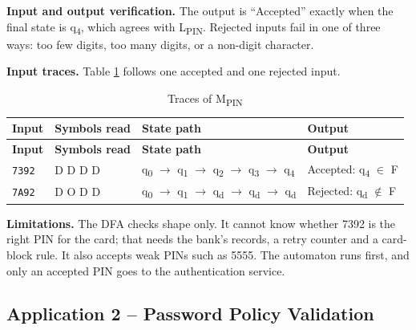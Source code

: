 \documentclass[12pt,a4paper]{article}
\begin{document}
\textbf{Input and output verification.} The output is ``Accepted'' exactly when the final state is q\textsubscript{4}, which agrees with L\textsubscript{PIN}. Rejected inputs fail in one of three ways: too few digits, too many digits, or a non-digit character.

\textbf{Input traces.} Table \ref{tab:pin_trace} follows one accepted and one rejected input.

{\small
\begin{longtable}{|>{\raggedright\arraybackslash}p{}|>{\raggedright\arraybackslash}p{}|>{\raggedright\arraybackslash}p{}|>{\raggedright\arraybackslash}p{}|}
\caption[Traces of MPIN]{Traces of M\textsubscript{PIN}}\label{tab:pin_trace}\\
\hline
\rowcolor{hdr}\textbf{Input} & \textbf{Symbols read} & \textbf{State path} & \textbf{Output}\\ \hline
\endfirsthead
\hline
\rowcolor{hdr}\textbf{Input} & \textbf{Symbols read} & \textbf{State path} & \textbf{Output}\\ \hline
\endhead
\texttt{7392} & D D D D & q\textsubscript{0} \ensuremath{\rightarrow} q\textsubscript{1} \ensuremath{\rightarrow} q\textsubscript{2} \ensuremath{\rightarrow} q\textsubscript{3} \ensuremath{\rightarrow} q\textsubscript{4} & Accepted: q\textsubscript{4} \ensuremath{\in} F\\ \hline
\texttt{7A92} & D O D D & q\textsubscript{0} \ensuremath{\rightarrow} q\textsubscript{1} \ensuremath{\rightarrow} q\textsubscript{d} \ensuremath{\rightarrow} q\textsubscript{d} \ensuremath{\rightarrow} q\textsubscript{d} & Rejected: q\textsubscript{d} \ensuremath{\notin} F\\ \hline
\end{longtable}}

\textbf{Limitations.} The DFA checks shape only. It cannot know whether 7392 is the right PIN for the card; that needs the bank's records, a retry counter and a card-block rule. It also accepts weak PINs such as 5555. The automaton runs first, and only an accepted PIN goes to the authentication service.

\subsection{Application 2 -- Password Policy Validation}
\end{document}
